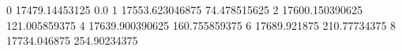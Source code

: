 0 17479.14453125 0.0
1 17553.623046875 74.478515625
2 17600.150390625 121.005859375
4 17639.900390625 160.755859375
6 17689.921875 210.77734375
8 17734.046875 254.90234375
